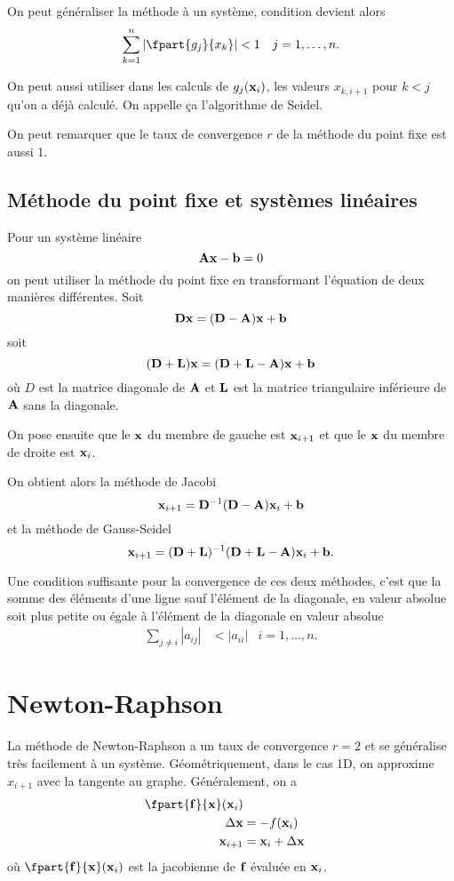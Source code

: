 On peut généraliser la méthode à un système,
condition devient alors
\begin{align*}
  \sum_{k=1}^n\left|\fpart{g_j}{x_k}\right| & < 1 & j = 1,\ldots,n.
\end{align*}

On peut aussi utiliser dans les calculs de $g_j({\bf x}_i)$,
les valeurs $x_{k,i+1}$ pour $k < j$ qu'on a déjà calculé.
On appelle ça l'algorithme de Seidel.

On peut remarquer que le taux de convergence $r$ de la méthode du
point fixe est aussi 1.

\subsection{Méthode du point fixe et systèmes linéaires}
Pour un système linéaire
\[ {\bf A}{\bf x} - {\bf b} = 0 \]
on peut utiliser la méthode du point fixe en transformant l'équation
de deux manières différentes.
Soit
\[ {\bf D}{\bf x} = ({\bf D} - {\bf A}){\bf x} + {\bf b} \]
soit
\[ ({\bf D} + {\bf L}){\bf x} = ({\bf D} + {\bf L} - {\bf A}){\bf x} + {\bf b} \]
où $D$ est la matrice diagonale de ${\bf A}$ et ${\bf L}$ est
la matrice triangulaire inférieure de ${\bf A}$ sans la diagonale.

On pose ensuite que le ${\bf x}$ du membre de gauche est ${\bf x}_{i+1}$
et que le ${\bf x}$ du membre de droite est ${\bf x}_i$.

On obtient alors la méthode de Jacobi
\[ {\bf x}_{i+1} = {\bf D}^{-1}({\bf D} - {\bf A}){\bf x}_i + {\bf b} \]
et la méthode de Gauss-Seidel
\[ {\bf x}_{i+1} = ({\bf D} + {\bf L})^{-1}
({\bf D} + {\bf L} - {\bf A}){\bf x}_i + {\bf b}. \]

Une condition suffisante pour la convergence de ces deux méthodes,
c'est que la somme des éléments d'une ligne sauf l'élément de la diagonale,
en valeur absolue soit plus petite ou égale à l'élément de la diagonale
en valeur absolue
\begin{align*}
  \sum_{j \neq i}|a_{ij}| & < |a_{ii}| & i = 1, \ldots, n.
\end{align*}

\section{Newton-Raphson}
La méthode de Newton-Raphson a un taux de convergence $r = 2$ et
se généralise très facilement à un système.
Géométriquement, dans le cas 1D,
on approxime $x_{i+1}$ avec la tangente au graphe.
Généralement, on a
\begin{align*}
  \fpart{\fv{f}}{\fv{x}}(\fv{x}_i)\\
  \Delta \fv{x} & = -f(\fv{x}_i)\\
  \fv{x}_{i+1} & = \fv{x}_i + \Delta \fv{x}
\end{align*}
où $\fpart{\fv{f}}{\fv{x}}(\fv{x}_i)$ est la jacobienne de ${\bf f}$ évaluée
en ${\bf x}_i$.

